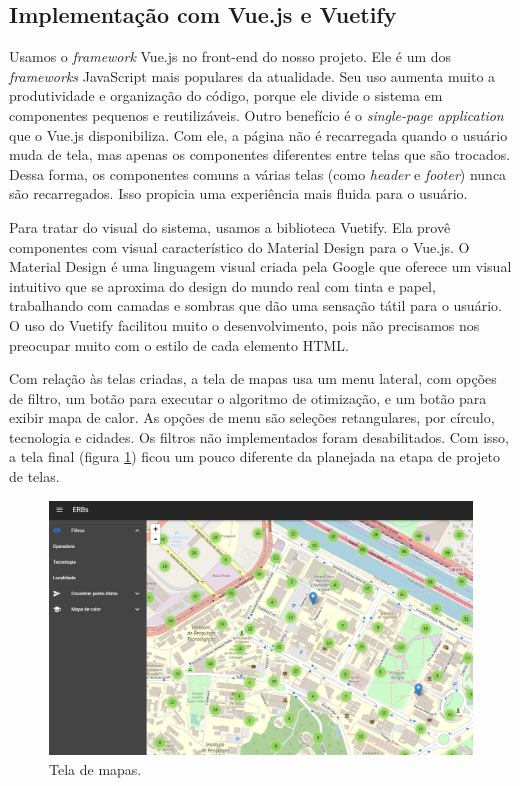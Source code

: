 \documentclass[]{politex}
\begin{document}
\subsection{Implementação com Vue.js e Vuetify}

Usamos o \textit{framework} Vue.js no front-end do nosso projeto. Ele é um dos
\textit{frameworks} JavaScript mais populares da atualidade. Seu uso aumenta
muito a produtividade e organização do código, porque ele divide o sistema em
componentes pequenos e reutilizáveis. Outro benefício é o \textit{single-page
application} que o Vue.js disponibiliza. Com ele, a página não é recarregada
quando o usuário muda de tela, mas apenas os componentes diferentes entre telas
que são trocados. Dessa forma, os componentes comuns a várias telas (como
\textit{header} e \textit{footer}) nunca são recarregados. Isso propicia uma
experiência mais fluida para o usuário.

Para tratar do visual do sistema, usamos a biblioteca Vuetify. Ela provê
componentes com visual característico do Material Design para o Vue.js. O
Material Design é uma linguagem visual criada pela Google que oferece um visual
intuitivo que se aproxima do design do mundo real com tinta e papel, trabalhando
com camadas e sombras que dão uma sensação tátil para o usuário. O uso do
Vuetify facilitou muito o desenvolvimento, pois não precisamos nos preocupar
muito com o estilo de cada elemento HTML.

Com relação às telas criadas, a tela de mapas usa um menu lateral, com opções de
filtro, um botão para executar o algoritmo de otimização, e um botão para exibir
mapa de calor. As opções de menu são seleções retangulares, por círculo,
tecnologia e cidades. Os filtros não implementados foram desabilitados. Com
isso, a tela final (figura \ref{fig:tela_mapas}) ficou um pouco diferente da
planejada na etapa de projeto de telas.

\begin{figure}[H]
    \centering
    \includegraphics[width=6in]{imagens/tela-mapas}
    \caption{Tela de mapas.}
    \label{fig:tela_mapas}
\end{figure}
\end{document}
